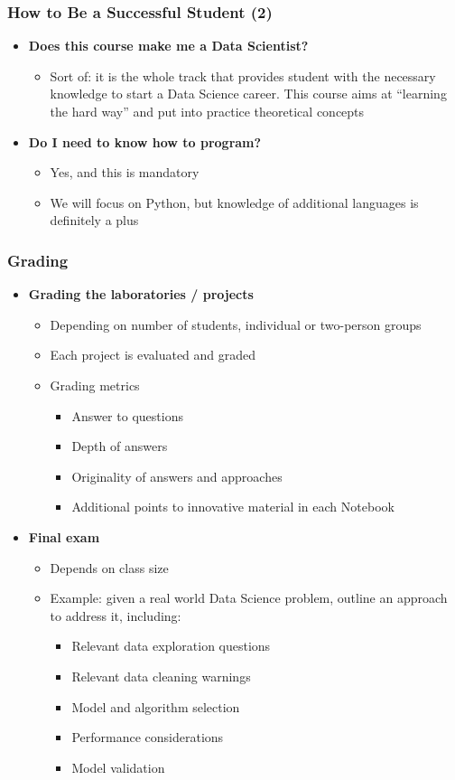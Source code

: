 \begin{frame}\frametitle{How to Be a Successful Student (2)}
\begin{itemize}
	\item {\bf Does this course make me a Data Scientist?}
	\begin{itemize}
		\item Sort of: it is the whole track that provides student with the necessary knowledge to start a Data Science career. This course aims at ``learning the hard way'' and put into practice theoretical concepts
	\end{itemize}
	\item {\bf Do I need to know how to program?}
	\begin{itemize}
		\item Yes, and this is mandatory
		\item We will focus on Python, but knowledge of additional languages is definitely a plus
	\end{itemize}
\end{itemize}
\end{frame}

\begin{frame}\frametitle{Grading}
\begin{itemize}
	\item {\bf Grading the laboratories / projects}
	\begin{itemize}
		\item Depending on number of students, individual or two-person groups
		\item Each project is evaluated and graded
		\item Grading metrics
		\begin{itemize}
			\item Answer to questions
			\item Depth of answers
			\item Originality of answers and approaches
			\item Additional points to innovative material in each Notebook
		\end{itemize}
	\end{itemize}
	\item {\bf Final exam}
	\begin{itemize}
		\item Depends on class size
		\item Example: given a real world Data Science problem, outline an approach to address it, including:
		\begin{itemize}
			\item Relevant data exploration questions
			\item Relevant data cleaning warnings
			\item Model and algorithm selection
			\item Performance considerations
			\item Model validation
		\end{itemize}
	\end{itemize}
\end{itemize}
\end{frame}

